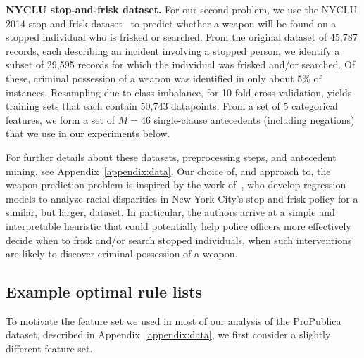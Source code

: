 \textbf{NYCLU stop-and-frisk dataset.} For our second problem, we use
the NYCLU 2014 stop-and-frisk dataset~\citep{nyclu:2014} to predict
whether a weapon will be found on a stopped individual who is frisked or searched.
%
From the original dataset of 45,787 records, each describing an incident involving
a stopped person, we identify a subset of 29,595 records for which the individual
was frisked and/or searched.
%
Of these, criminal possession of a weapon was identified in only about 5\% of instances.
%
Resampling due to class imbalance, for 10-fold cross-validation, yields training sets
that each contain 50,743 datapoints.
%
From a set of 5 categorical features, we form a set of ${M=46}$ single-clause antecedents (including negations)
that we use in our experiments below.

For further details about these datasets, preprocessing steps, and antecedent mining,
see Appendix~\ref{appendix:data}.
%
Our choice of, and approach to, the weapon prediction problem is inspired by the work
of~\citet{Goel16}, who develop regression models to analyze racial disparities
in New York City's stop-and-frisk policy for a similar, but larger, dataset.
%
In particular, the authors arrive at a simple and interpretable heuristic that
could potentially help police officers more effectively decide when to
frisk and/or search stopped individuals, \ie when such
interventions are likely to discover criminal possession of a weapon.

\subsection{Example optimal rule lists}
\label{sec:examples}

To motivate the feature set we used in most of our analysis of the ProPublica dataset,
described in Appendix~\ref{appendix:data}, we first consider a slightly different feature set.

